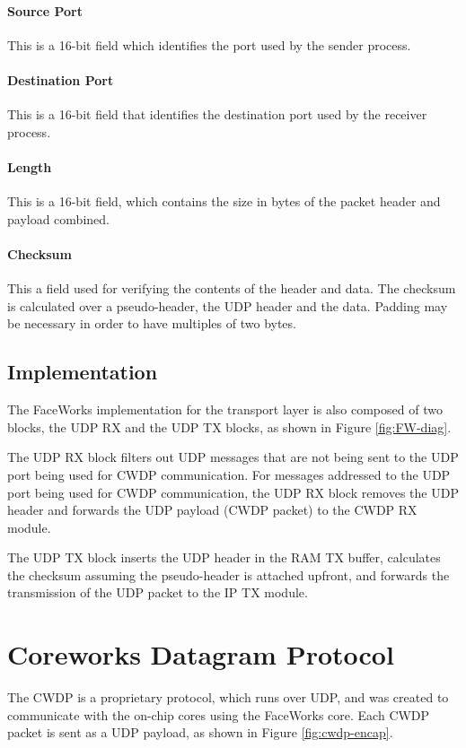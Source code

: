 \documentclass[defaultstyle,10pt,master,Helvetica]{thesis}
\begin{document}
\paragraph*{Source Port} This is a 16-bit field which identifies the port used by the sender process.
\paragraph*{Destination Port} This is a 16-bit field that identifies the destination port used by the receiver process.
\paragraph*{Length} This is a 16-bit field, which contains the size in bytes of the packet header and payload combined.
\paragraph*{Checksum} This a field used for verifying the contents of the header and data. The checksum is calculated over a pseudo-header, the \ac{UDP} header and the data. Padding may be necessary in order to have multiples of two bytes.

\subsection{Implementation}

The FaceWorks implementation for the transport layer is also composed of two blocks,  the \ac{UDP} RX and the \ac{UDP} TX blocks, as shown in Figure \ref{fig:FW-diag}.

The \ac{UDP} RX block filters out \ac{UDP} messages that are not being sent to the \ac{UDP} port being used for \ac{CWDP} communication. For messages addressed to the \ac{UDP} port being used for \ac{CWDP} communication, the \ac{UDP} RX block removes the \ac{UDP} header and forwards the \ac{UDP} payload (\ac{CWDP} packet) to the \ac{CWDP} RX module. 

The \ac{UDP} TX block inserts the \ac{UDP} header in the \acs{RAM} TX buffer, calculates the checksum assuming the pseudo-header is attached upfront, and forwards the transmission of the \ac{UDP} packet to the \ac{IP} TX module.
\clearpage
\section{Coreworks Datagram Protocol}

The \acf{CWDP}\cite{Facedata} is a proprietary protocol, which runs over \ac{UDP}, and was created to communicate with the on-chip cores using the FaceWorks core. Each \ac{CWDP} packet is sent as a \ac{UDP} payload, as shown in Figure \ref{fig:cwdp-encap}.
\end{document}
